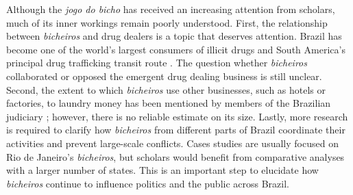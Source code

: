 \documentclass[a4paper,12pt]{article}
\begin{document}
Although the \textit{jogo do bicho} has received an increasing attention from scholars, much of its inner workings remain poorly understood. First, the relationship between \textit{bicheiros} and drug dealers is a topic that deserves attention. Brazil has become one of the world's largest consumers of illicit drugs and South America's principal drug trafficking transit route \citep{miraglia2015drugs,misse2011crime}. The question whether \textit{bicheiros} collaborated or opposed the emergent drug dealing business is still unclear. Second, the extent to which \textit{bicheiros} use other businesses, such as hotels or factories, to laundry money has been mentioned by members of the Brazilian judiciary \citep{globo2012bicheiro,globo2015cacaniquel}; however, there is no reliable estimate on its size. Lastly, more research is required to clarify how \textit{bicheiros} from different parts of Brazil coordinate their activities and prevent large-scale conflicts. Cases studies are usually focused on Rio de Janeiro's \textit{bicheiros}, but scholars would benefit from comparative analyses with a larger number of states. This is an important step to elucidate how \textit{bicheiros} continue to influence politics and the public across Brazil.

\newpage


\end{document}
